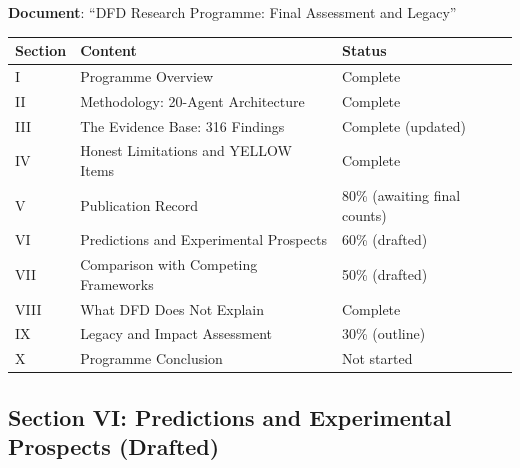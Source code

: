 \documentclass[11pt,a4paper]{article}
\begin{document}
\begin{tcolorbox}[colback=blue!5!white, colframe=dfdblue, title=\textbf{PROGRAMME FINAL ASSESSMENT: 60\% COMPLETE}]
\textbf{Document}: ``DFD Research Programme: Final Assessment and Legacy''

\begin{center}
\begin{tabular}{lll}
\toprule
\textbf{Section} & \textbf{Content} & \textbf{Status} \\
\midrule
I & Programme Overview & Complete \\
II & Methodology: 20-Agent Architecture & Complete \\
III & The Evidence Base: 316 Findings & Complete (updated) \\
IV & Honest Limitations and YELLOW Items & Complete \\
V & Publication Record & 80\% (awaiting final counts) \\
VI & Predictions and Experimental Prospects & 60\% (drafted) \\
VII & Comparison with Competing Frameworks & 50\% (drafted) \\
VIII & What DFD Does Not Explain & Complete \\
IX & Legacy and Impact Assessment & 30\% (outline) \\
X & Programme Conclusion & Not started \\
\bottomrule
\end{tabular}
\end{center}
\end{tcolorbox}

\subsection{Section VI: Predictions and Experimental Prospects (Drafted)}
\end{document}
